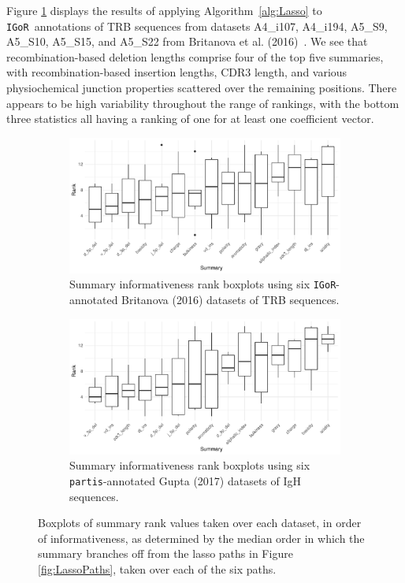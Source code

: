 \documentclass{article}
\newcommand{\partis}{\texttt{partis}}
\newcommand{\igor}{\texttt{IGoR}}
\begin{document}
Figure \ref{fig:IgorLassoScores} displays the results of applying Algorithm~\ref{alg:Lasso} to \igor\ annotations of TRB sequences from datasets A4\_i107, A4\_i194, A5\_S9, A5\_S10, A5\_S15, and A5\_S22 from Britanova et al. (2016)~\cite{Britanova2016-iw}.
We see that recombination-based deletion lengths comprise four of the top five summaries, with recombination-based insertion lengths, CDR3 length, and various physiochemical junction properties scattered over the remaining positions.
There appears to be high variability throughout the range of rankings, with the bottom three statistics all having a ranking of one for at least one coefficient vector.
\begin{figure}
        \begin{subfigure}{\linewidth}
    	\includegraphics[width=\linewidth]{Figures/Lasso/igor_lasso_scores.pdf}
		\caption{Summary informativeness rank boxplots using six \igor-annotated Britanova (2016) datasets of TRB sequences.}
		\label{fig:IgorLassoScores}
    \end{subfigure}
    \begin{subfigure}{\linewidth}
    	\includegraphics[width=\linewidth]{Figures/Lasso/partis_lasso_scores.pdf}
		\caption{Summary informativeness rank boxplots using six \partis-annotated Gupta (2017) datasets of IgH sequences.}
		\label{fig:PartisLassoScores}
    \end{subfigure}
    \caption{Boxplots of summary rank values taken over each dataset, in order of informativeness, as determined by the median order in which the summary branches off from the lasso paths in Figure \ref{fig:LassoPaths}, taken over each of the six paths.}
    \label{fig:LassoScores}
\end{figure}
\end{document}
